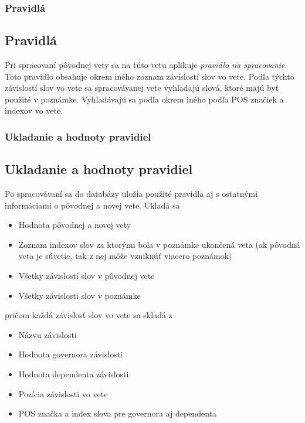 %
%
{
	\subsubsection{Pravidlá}
}
{
	\subsection{Pravidlá}
}
\label{subsubsec:notenizer_pravidla}
Pri spracovaní pôvodnej vety sa na túto vetu aplikuje \textit{pravidlo na spracovanie}. Toto pravidlo obsahuje okrem iného zoznam závislostí slov vo vete. Podľa týchto závislostí slov vo vete sa spracovávanej vete vyhľadajú slová, ktoré majú byť použité v poznámke. Vyhľadávajú sa podľa okrem iného podľa POS značiek a indexov vo vete.

%
%
{
	\subsubsection{Ukladanie a hodnoty pravidiel}
}
{
	\subsection{Ukladanie a hodnoty pravidiel}
}
\label{subsubsec:notenizer_ukldanie_a_hodnoty_pravidiel}
Po spracovávaní sa do databázy uložia použité pravidla aj s ostatnými informáciami o pôvodnej a novej vete. Ukladá sa 
\begin{itemize}
	\item Hodnota pôvodnej a novej vety
	\item Zoznam indexov slov za ktorými bola v poznámke ukončená veta (ak pôvodná veta je súvetie, tak z nej môže vzniknúť viacero poznámok)
	\item Všetky závislostí slov v pôvodnej vete
	\item Všetky závislosti slov v poznámke
\end{itemize}
pričom každá závislosť slov vo vete sa skladá z 
\begin{itemize}
	\item Názvu závislosti
	\item Hodnota governora závislosti
	\item Hodnota dependenta závislosti
	\item Pozícia závislosti vo vete
	\item POS značka a index slova pre governora aj dependenta
\end{itemize}

